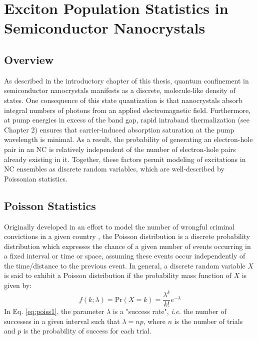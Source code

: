 \chapter{Exciton Population Statistics in Semiconductor Nanocrystals}    %

\section{Overview}     %
As described in the introductory chapter of this thesis, quantum confinement in semiconductor nanocrystals manifests as a discrete, molecule-like density of states. One consequence of this state quantization is that nanocrystals absorb integral numbers of photons from an applied electromagnetic field. Furthermore, at pump energies in excess of the band gap, rapid intraband thermalization (see Chapter 2) ensures that carrier-induced absorption saturation at the pump wavelength is minimal. As a result, the probability of generating an electron-hole pair in an NC is relatively independent of the number of electron-hole pairs already existing in it. Together, these factors permit modeling of excitations in NC ensembles as discrete random variables, which are well-described by Poissonian statistics. 

\section{Poisson Statistics}  %
Originally developed in an effort to model the number of wrongful criminal convictions in a given country \cite{poisson1837probabilite}, the Poisson distribution is a discrete probability distribution which expresses the chance of a given number of events occurring in a fixed interval or time or space, assuming these events occur independently of the time/distance to the previous event. In general, a discrete random variable $X$ is said to exhibit a Poisson distribution if the probability mass function of $X$ is given by:
\begin{equation}\label{eq:poiss1}
f(k; \lambda) = \mathrm{Pr}(X = k) = \frac{\lambda^k}{k!}e^{-\lambda}
\end{equation}
In Eq. \ref{eq:poiss1}, the parameter $\lambda$ is a "success rate", \emph{i.e.} the number of successes in a given interval such that $\lambda = np$, where $n$ is the number of trials and $p$ is the probability of success for each trial.

